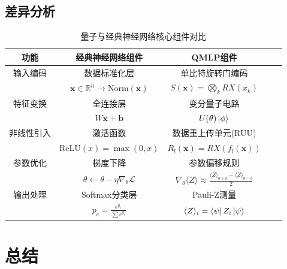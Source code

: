 \documentclass[10pt,a4paper,twoside]{article}
\numberwithin{figure}{section}%
\numberwithin{table}{section}%
\begin{document}
\subsection{差异分析}
\begin{table}[H]
    \centering
    \caption{量子与经典神经网络核心组件对比}
    \label{tab:quantum_classical}
    \begin{tabular}{ccccc}
        \toprule
        \textbf{功能} & \textbf{经典神经网络组件} & \textbf{QMLP组件} \\
        \midrule
        输入编码 & 数据标准化层 & 单比特旋转门编码 \\
        & $\mathbf{x} \in \mathbb{R}^n \to \text{Norm}(\mathbf{x})$ & $S(\mathbf{x}) = \bigotimes_k RX(x_k)$ \\
        \midrule
        特征变换 & 全连接层 & 变分量子电路 \\
        & $W\mathbf{x} + \mathbf{b}$ & $U(\theta)\ket{\phi}$ \\
        \midrule
        非线性引入 & 激活函数 & 数据重上传单元(RUU) \\
        & $\text{ReLU}(x)=\max(0,x)$ & $R_l(\mathbf{x}) = RX(f_l(\mathbf{x}))$ \\
        \midrule
        参数优化 & 梯度下降 & 参数偏移规则 \\
        & $\theta \leftarrow \theta - \eta \nabla_\theta \mathcal{L}$ & $\nabla_\theta \langle Z\rangle \approx \frac{\langle Z\rangle_{\theta+\delta} - \langle Z\rangle_{\theta-\delta}}{2}$ \\
        \midrule
        输出处理 & Softmax分类层 & Pauli-Z测量 \\
        & $p_c = \frac{e^{y_c}}{\sum e^{y_i}}$ & $\langle Z\rangle_i = \bra{\psi}Z_i\ket{\psi}$ \\
        \bottomrule
    \end{tabular}
\end{table}

\section{总结}


\end{document}
